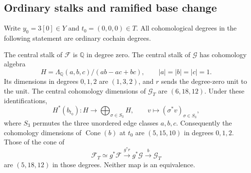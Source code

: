 \subsection{Ordinary stalks and ramified base change}

Write $y_0=3[0]\in Y$ and $t_0=(0,0,0)\in T$. All cohomological
degrees in the following statement are ordinary cochain degrees.

\begin{theorem}\label{cf:comparison}
The central stalk of $\mathcal F$ is $\mathbb Q$ in degree zero.
The central stalk of $\mathcal G$ has cohomology algebra
\begin{equation}\label{cf:arrangement-ring}
 H=\Lambda_{\mathbb Q}(a,b,c)/(ab-ac+bc),\qquad
 |a|=|b|=|c|=1.
\end{equation}
Its dimensions in degrees $0,1,2$ are $(1,3,2)$, and $r$ sends
the degree-zero unit to the unit. The central cohomology dimensions
of $\mathcal G_T$ are $(6,18,12)$. Under these identifications,
\begin{equation}\label{cf:actual-base-change}
 H^*(b_{t_0}):H\longrightarrow\bigoplus_{\sigma\in S_3}H,
 \qquad v\longmapsto(\sigma^*v)_{\sigma\in S_3},
\end{equation}
where $S_3$ permutes the three unordered edge classes $a,b,c$.
Consequently the cohomology dimensions of $\operatorname{Cone}(b)$
at $t_0$ are $(5,15,10)$ in degrees $0,1,2$. Those of the cone of
\begin{equation}\label{cf:composite}
 \mathcal F_T\simeq g^*\mathcal F
       \xrightarrow{g^*r}g^*\mathcal G
       \xrightarrow{b}\mathcal G_T
\end{equation}
are $(5,18,12)$ in those degrees. Neither map is an equivalence.
\end{theorem}
